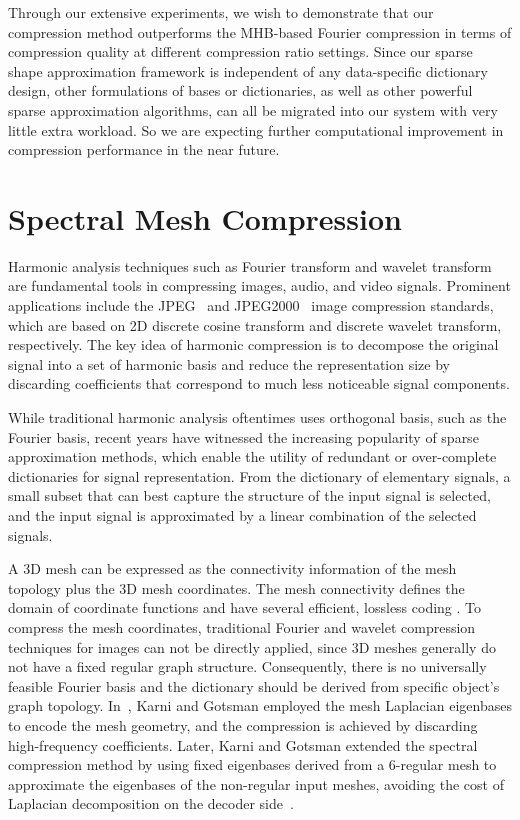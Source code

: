 Through our extensive experiments, we wish to demonstrate that our
compression method outperforms the MHB-based Fourier compression in
terms of compression quality at different compression ratio settings.
Since our sparse shape approximation framework is independent of any
data-specific dictionary design, other formulations of bases or
dictionaries, as well as other powerful sparse approximation
algorithms, can all be migrated into our system with very little extra
workload. So we are expecting further computational improvement in
compression performance in the near future.

\section{Spectral Mesh Compression}

Harmonic analysis techniques such as Fourier transform and wavelet
transform are fundamental tools in compressing images,
audio, and video signals. Prominent applications include the
JPEG~\cite{wallace1992jpeg} and JPEG2000~\cite{skodras2001jpeg} image
compression standards, which are based on 2D discrete cosine transform
and discrete wavelet transform, respectively. The key idea of harmonic
compression is to decompose the original signal into a set of harmonic
basis and reduce the representation size by discarding coefficients
that correspond to much less noticeable signal components.

While traditional harmonic analysis oftentimes uses orthogonal basis,
such as the Fourier basis, recent years have witnessed the increasing
popularity of sparse approximation methods, which enable the utility
of redundant or over-complete dictionaries for signal representation.
From the dictionary of elementary signals, a small subset that can
best capture the structure of the input signal is selected, and the
input signal is approximated by a linear combination of the selected signals.

A 3D mesh can be expressed as the connectivity information of the mesh
topology plus the 3D mesh coordinates. The mesh connectivity defines
the domain of coordinate functions and have several efficient,
lossless coding \cite{Rossignac1999,Gumhold:1998}. To compress the
mesh coordinates, traditional Fourier and wavelet compression
techniques for images can not be directly applied, since 3D meshes
generally do not have a fixed regular graph structure. Consequently,
there is no universally feasible Fourier basis and the dictionary
should be derived from specific object's graph topology.
In~\cite{Karni2000}, Karni and Gotsman employed the mesh
Laplacian eigenbases to encode the mesh geometry, and the compression
is achieved by discarding high-frequency coefficients. Later, Karni
and Gotsman extended the spectral compression method by using fixed
eigenbases derived from a 6-regular mesh to approximate the eigenbases
of the non-regular input meshes, avoiding the cost of Laplacian
decomposition on the decoder side~\cite{karni20013d}.

